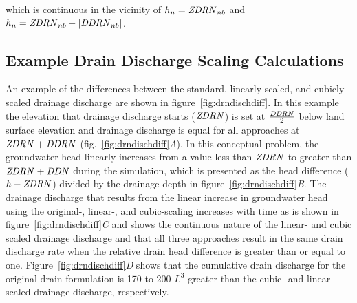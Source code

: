\noindent which is continuous in the vicinity of $h_n = \mathit{ZDRN}_{nb}$ and $h_n = \mathit{ZDRN}_{nb} - \left| \mathit{DDRN}_{nb} \right| $.

\subsection{Example Drain Discharge Scaling Calculations}

An example of the differences between the standard, linearly-scaled, and cubicly-scaled drainage discharge are shown in figure~\ref{fig:drndischdiff}. In this example the elevation that drainage discharge starts ($\mathit{ZDRN}$) is set at $\frac{\mathit{DDRN}}{2}$ below land surface elevation and drainage discharge is equal for all approaches at $\mathit{ZDRN} + \mathit{DDRN}$ (fig.~\ref{fig:drndischdiff}\textit{A}). In this conceptual problem, the groundwater head linearly increases from a value less than $\mathit{ZDRN}$ to greater than $\mathit{ZDRN + DDN}$ during the simulation, which is presented as the head difference ($h - \mathit{ZDRN}$) divided by the drainage depth in figure~\ref{fig:drndischdiff}\textit{B}. The drainage discharge that results from the linear increase in groundwater head using the original-, linear-, and cubic-scaling increases with time as is shown in figure~\ref{fig:drndischdiff}\textit{C} and shows the continuous nature of the linear- and cubic scaled drainage discharge and that all three approaches result in the same drain discharge rate when the relative drain head difference is greater than or equal to one. Figure~\ref{fig:drndischdiff}\textit{D} shows that the cumulative drain discharge for the original drain formulation is 170 to 200 $L^3$ greater than the cubic- and linear-scaled drainage discharge, respectively.

